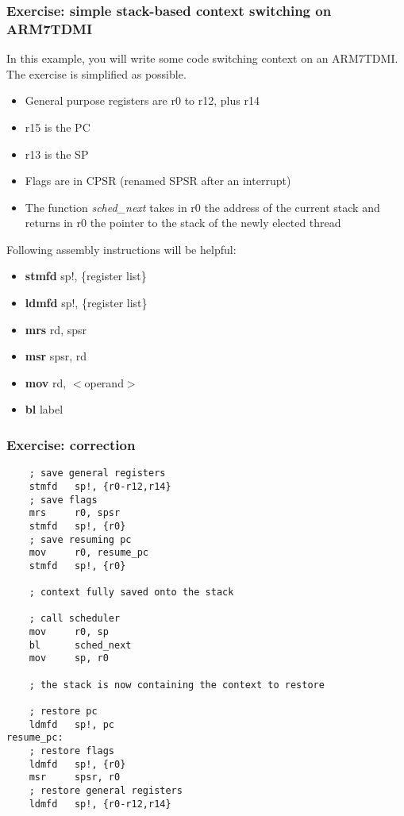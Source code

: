 \begin{frame}
  \frametitle{Exercise: simple stack-based context switching on
  ARM7TDMI}

  In this example, you will write some code switching context on an
  ARM7TDMI. The exercise is simplified as possible.

  \begin{itemize}
  \item
    General purpose registers are r0 to r12, plus r14
  \item
    r15 is the PC
  \item
    r13 is the SP
  \item
    Flags are in CPSR (renamed SPSR after an interrupt)
  \item
    The function \emph{sched\_next} takes in r0 the address of the
    current stack and returns in r0 the pointer to the stack of the
    newly elected thread
  \end{itemize}

  \-

  Following assembly instructions will be helpful:

  \begin{itemize}
  \item
    \textbf{stmfd} sp!, \{register list\}
  \item
    \textbf{ldmfd} sp!, \{register list\}
  \item
    \textbf{mrs} rd, spsr
  \item
    \textbf{msr} spsr, rd
  \item
    \textbf{mov} rd, $<$operand$>$
  \item
    \textbf{bl} label
  \end{itemize}

\end{frame}


\begin{frame}[containsverbatim]
  \frametitle{Exercise: correction}

  \begin{verbatim}
    ; save general registers
    stmfd   sp!, {r0-r12,r14}
    ; save flags
    mrs     r0, spsr
    stmfd   sp!, {r0}
    ; save resuming pc
    mov     r0, resume_pc
    stmfd   sp!, {r0}

    ; context fully saved onto the stack

    ; call scheduler
    mov     r0, sp
    bl      sched_next
    mov	    sp, r0

    ; the stack is now containing the context to restore

    ; restore pc
    ldmfd   sp!, pc
resume_pc:
    ; restore flags
    ldmfd   sp!, {r0}
    msr     spsr, r0
    ; restore general registers
    ldmfd   sp!, {r0-r12,r14}
  \end{verbatim}

\end{frame}

